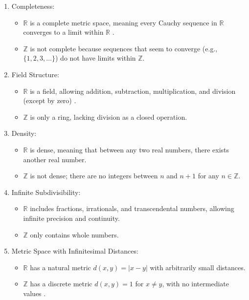\begin{enumerate}[topsep=0pt]
    \item Completeness:
    \begin{itemize}
        \item \( \mathbb{R} \) is a complete metric space, meaning every Cauchy sequence in \( \mathbb{R} \) converges to a limit within \( \mathbb{R} \) \cite{rudin1976}.
        \item \( \mathbb{Z} \) is not complete because sequences that seem to converge (e.g., \( \{1, 2, 3, \dots\} \)) do not have limits within \( \mathbb{Z} \).
    \end{itemize}

    \item Field Structure:
    \begin{itemize}
        \item \( \mathbb{R} \) is a field, allowing addition, subtraction, multiplication, and division (except by zero) \cite{Sutherland02}.
        \item \( \mathbb{Z} \) is only a ring, lacking division as a closed operation.
    \end{itemize}

    \item Density:
    \begin{itemize}
        \item \( \mathbb{R} \) is dense, meaning that between any two real numbers, there exists another real number.
        \item \( \mathbb{Z} \) is not dense; there are no integers between \( n \) and \( n+1 \) for any \( n \in \mathbb{Z} \).
    \end{itemize}

    \item Infinite Subdivisibility:
    \begin{itemize}
        \item \( \mathbb{R} \) includes fractions, irrationals, and transcendental numbers, allowing infinite precision and continuity.
        \item \( \mathbb{Z} \) only contains whole numbers.
    \end{itemize}

    \item Metric Space with Infinitesimal Distances:
    \begin{itemize}
        \item \( \mathbb{R} \) has a natural metric \( d(x, y) = |x - y| \) with arbitrarily small distances.
        \item \( \mathbb{Z} \) has a discrete metric \( d(x, y) = 1 \) for \( x \neq y \), with no intermediate values \cite{munkres2000}.
    \end{itemize}
\end{enumerate}

